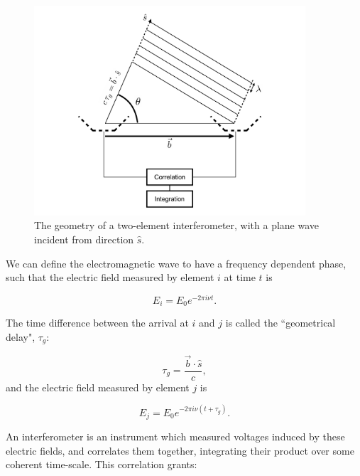 \begin{figure}
\centering
\includegraphics[width=0.9\textwidth]{chapters/interferometry/figures/visibility_explanation.pdf}
\caption{The geometry of a two-element interferometer, with a plane wave incident from direction $\hat{s}$.}
\label{fig:interferometry_2element}
\end{figure}

We can define the electromagnetic wave to have a frequency dependent phase, such that the electric field measured by element $i$ at time $t$ is

\begin{equation}
E_i = E_0 e^{-2\pi i \nu t}.
\label{eq:Ei}
\end{equation}

The time difference between the arrival at $i$ and $j$ is called the ``geometrical delay", $\tau_g$:

\begin{equation}
\tau_g = \frac{\vec{b}\cdot\hat{s}}{c},
\end{equation}
and the electric field measured by element $j$ is

\begin{equation}
E_j = E_0 e^{-2\pi i \nu (t+\tau_g)}.
\end{equation}

An interferometer is an instrument which measured voltages induced by these electric fields, and correlates them together, integrating their product over some coherent time-scale. This correlation grants:

